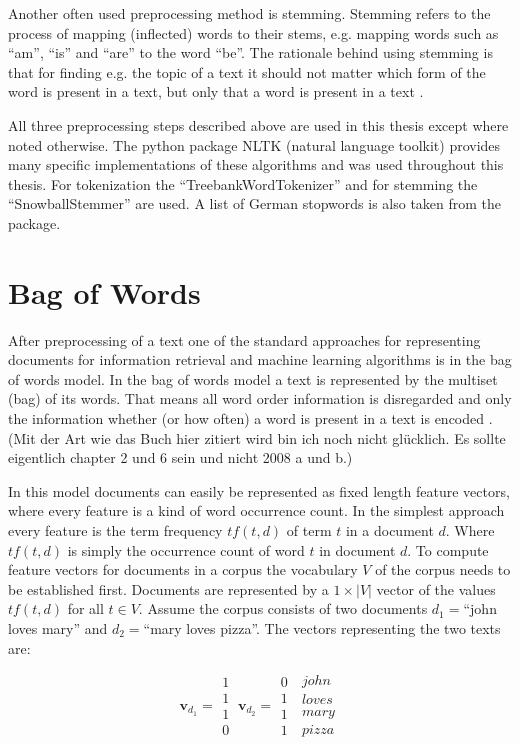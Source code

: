 \documentclass[Thesis.tex]{subfiles}
\begin{document}
Another often used preprocessing method is stemming. Stemming refers
to the process of mapping (inflected) words to their stems, e.g. mapping
words such as ``am'', ``is'' and ``are'' to the word ``be''.
The rationale behind using stemming is that for finding e.g. the topic
of a text it should not matter which form of the word is present in
a text, but only that a word is present in a text \citep{Manning2008prepr}.

All three preprocessing steps described above are used in this thesis
except where noted otherwise. The python package NLTK (natural language
toolkit) provides many specific implementations of these algorithms
and was used throughout this thesis. For tokenization the ``TreebankWordTokenizer''
and for stemming the ``SnowballStemmer'' are used. A list of German stopwords is also taken from the package.


\section{Bag of Words}

After preprocessing of a text one of the standard approaches for representing
documents for information retrieval and machine learning algorithms
is in the bag of words model. In the bag of words model a text is
represented by the multiset (bag) of its words. That means all word
order information is disregarded and only the information whether
(or how often) a word is present in a text is encoded \citep{Manning2008vect}. (Mit der Art wie das Buch hier zitiert wird bin ich noch nicht glücklich. Es sollte eigentlich chapter 2 und 6 sein und nicht 2008 a und b.)

In this model documents can easily be represented as fixed length
feature vectors, where every feature is a kind of word occurrence
count. In the simplest approach every feature is the term frequency
$tf(t,d)$ of term $t$ in a document $d$. Where $tf(t,d)$ is simply
the occurrence count of word $t$ in document $d$. To compute feature
vectors for documents in a corpus the vocabulary $V$ of the corpus
needs to be established first. Documents are represented by a $1\times|V|$
vector of the values $tf(t,d)$ for all $t\in V$. Assume the corpus
consists of two documents $d_{1}=$``john loves mary'' and $d_{2}=$``mary
loves pizza''. The vectors representing the two texts are:

\[
\textbf{v}_{d_1}=\begin{array}{c}
1\\
1\\
1\\
0
\end{array}\ \textbf{v}_{d_2}=\begin{array}{c}
0\\
1\\
1\\
1
\end{array}\ \begin{array}{c}
john\\
loves\\
mary\\
pizza
\end{array}
\]
\end{document}
